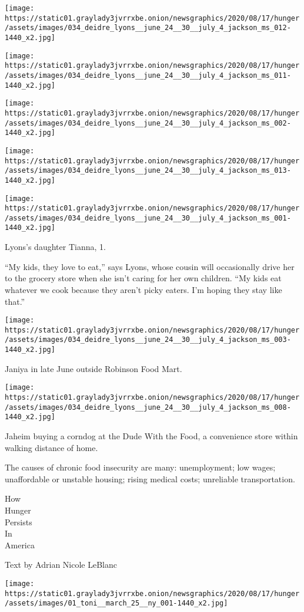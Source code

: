\texttt{[image: https://static01.graylady3jvrrxbe.onion/newsgraphics/2020/08/17/hunger/assets/images/034\_deidre\_lyons\_\_june\_24\_\_30\_\_july\_4\_jackson\_ms\_012-1440\_x2.jpg]}

\texttt{[image: https://static01.graylady3jvrrxbe.onion/newsgraphics/2020/08/17/hunger/assets/images/034\_deidre\_lyons\_\_june\_24\_\_30\_\_july\_4\_jackson\_ms\_011-1440\_x2.jpg]}

\texttt{[image: https://static01.graylady3jvrrxbe.onion/newsgraphics/2020/08/17/hunger/assets/images/034\_deidre\_lyons\_\_june\_24\_\_30\_\_july\_4\_jackson\_ms\_002-1440\_x2.jpg]}

\texttt{[image: https://static01.graylady3jvrrxbe.onion/newsgraphics/2020/08/17/hunger/assets/images/034\_deidre\_lyons\_\_june\_24\_\_30\_\_july\_4\_jackson\_ms\_013-1440\_x2.jpg]}

\texttt{[image: https://static01.graylady3jvrrxbe.onion/newsgraphics/2020/08/17/hunger/assets/images/034\_deidre\_lyons\_\_june\_24\_\_30\_\_july\_4\_jackson\_ms\_001-1440\_x2.jpg]}

Lyons's daughter Tianna, 1.

``My kids, they love to eat,'' says Lyons, whose cousin will
occasionally drive her to the grocery store when she isn't caring for
her own children. ``My kids eat whatever we cook because they aren't
picky eaters. I'm hoping they stay like that.''

\texttt{[image: https://static01.graylady3jvrrxbe.onion/newsgraphics/2020/08/17/hunger/assets/images/034\_deidre\_lyons\_\_june\_24\_\_30\_\_july\_4\_jackson\_ms\_003-1440\_x2.jpg]}

Janiya in late June outside Robinson Food Mart.

\texttt{[image: https://static01.graylady3jvrrxbe.onion/newsgraphics/2020/08/17/hunger/assets/images/034\_deidre\_lyons\_\_june\_24\_\_30\_\_july\_4\_jackson\_ms\_008-1440\_x2.jpg]}

Jaheim buying a corndog at the Dude With the Food, a convenience store
within walking distance of home.

The causes of chronic food insecurity are many: unemployment; low wages;
unaffordable or unstable housing; rising medical costs; unreliable
transportation.

How\\
Hunger\\
Persists\\
In\\
America

Text by Adrian Nicole LeBlanc

\texttt{[image: https://static01.graylady3jvrrxbe.onion/newsgraphics/2020/08/17/hunger/assets/images/01\_toni\_\_march\_25\_\_ny\_001-1440\_x2.jpg]}


